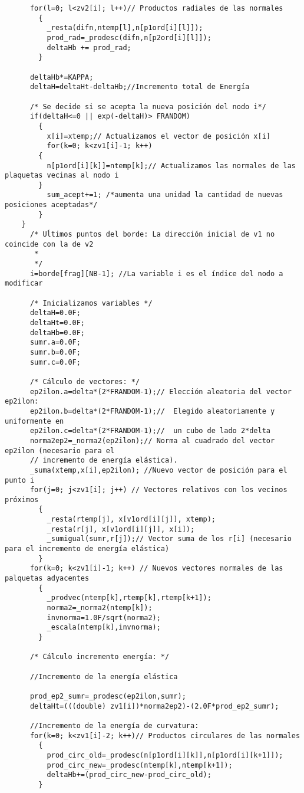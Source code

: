 \begin{verbatim}
	  for(l=0; l<zv2[i]; l++)// Productos radiales de las normales
	    {
	      _resta(difn,ntemp[l],n[p1ord[i][l]]);
	      prod_rad=_prodesc(difn,n[p2ord[i][l]]);
	      deltaHb += prod_rad;
	    }
	 
	  deltaHb*=KAPPA;
	  deltaH=deltaHt-deltaHb;//Incremento total de Energía
	  
	  /* Se decide si se acepta la nueva posición del nodo i*/
	  if(deltaH<=0 || exp(-deltaH)> FRANDOM)
	    {
	      x[i]=xtemp;// Actualizamos el vector de posición x[i]
	      for(k=0; k<zv1[i]-1; k++)
		{
		  n[p1ord[i][k]]=ntemp[k];// Actualizamos las normales de las plaquetas vecinas al nodo i
 		}
	      sum_acept+=1; /*aumenta una unidad la cantidad de nuevas posiciones aceptadas*/
	    }
	}
      /* Uĺtimos puntos del borde: La dirección inicial de v1 no coincide con la de v2
       * 
       */
      i=borde[frag][NB-1]; //La variable i es el índice del nodo a modificar
    
	  /* Inicializamos variables */
	  deltaH=0.0F;
	  deltaHt=0.0F;
	  deltaHb=0.0F;
	  sumr.a=0.0F;
	  sumr.b=0.0F;
	  sumr.c=0.0F;
	  
	  /* Cálculo de vectores: */      
	  ep2ilon.a=delta*(2*FRANDOM-1);// Elección aleatoria del vector ep2ilon:
	  ep2ilon.b=delta*(2*FRANDOM-1);//  Elegido aleatoriamente y uniformente en   
	  ep2ilon.c=delta*(2*FRANDOM-1);//  un cubo de lado 2*delta
	  norma2ep2=_norma2(ep2ilon);// Norma al cuadrado del vector ep2ilon (necesario para el 
	  // incremento de energía elástica).
	  _suma(xtemp,x[i],ep2ilon); //Nuevo vector de posición para el punto i
	  for(j=0; j<zv1[i]; j++) // Vectores relativos con los vecinos próximos
	    {
	      _resta(rtemp[j], x[v1ord[i][j]], xtemp);
	      _resta(r[j], x[v1ord[i][j]], x[i]); 
	      _sumigual(sumr,r[j]);// Vector suma de los r[i] (necesario para el incremento de energía elástica)
	    }
	  for(k=0; k<zv1[i]-1; k++) // Nuevos vectores normales de las palquetas adyacentes
	    {
	      _prodvec(ntemp[k],rtemp[k],rtemp[k+1]);
	      norma2=_norma2(ntemp[k]);
	      invnorma=1.0F/sqrt(norma2);
	      _escala(ntemp[k],invnorma);
	    }
	  
	  /* Cálculo incremento energía: */
	  
	  //Incremento de la energía elástica
	  
	  prod_ep2_sumr=_prodesc(ep2ilon,sumr);
	  deltaHt=(((double) zv1[i])*norma2ep2)-(2.0F*prod_ep2_sumr);
	  
	  //Incremento de la energía de curvatura:
	  for(k=0; k<zv1[i]-2; k++)// Productos circulares de las normales
	    {
	      prod_circ_old=_prodesc(n[p1ord[i][k]],n[p1ord[i][k+1]]);
	      prod_circ_new=_prodesc(ntemp[k],ntemp[k+1]);
	      deltaHb+=(prod_circ_new-prod_circ_old);
	    }


\end{verbatim}
